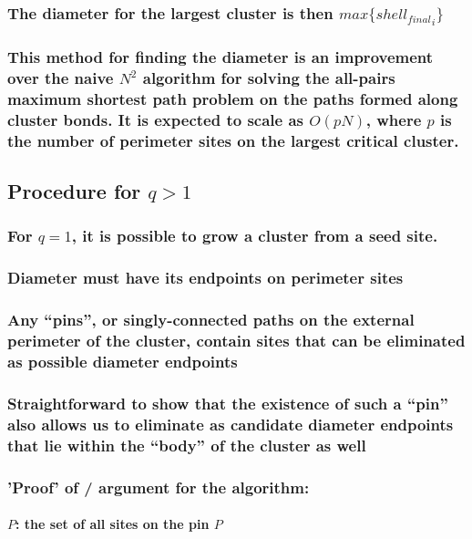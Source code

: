 \documentclass[pre,preprint]{revtex4-1}
\begin{document}
\subsubsection{The diameter for the largest cluster is then $max\{{shell_{final}}_i\}$}
\label{sec-2.3.7}
\subsubsection{This method for finding the diameter is an improvement over the naive $N^2$ algorithm for solving the all-pairs maximum shortest path problem on the paths formed along cluster bonds. It is expected to scale as $O(pN)$, where $p$ is the number of perimeter sites on the largest critical cluster.}
\label{sec-2.3.8}
\subsection{Procedure for $q>1$}
\label{sec-2.4}
\subsubsection{For $q=1$, it is possible to grow a cluster from a seed site.}
\label{sec-2.4.1}
\subsubsection{Diameter must have its endpoints on perimeter sites}
\label{sec-2.4.2}
\subsubsection{Any ``pins'', or singly-connected paths on the external perimeter of the cluster, contain sites that can be eliminated as possible diameter endpoints}
\label{sec-2.4.3}
\subsubsection{Straightforward to show that the existence of such a ``pin'' also allows us to eliminate as candidate diameter endpoints that lie within the ``body'' of the cluster as well}
\label{sec-2.4.4}
\subsubsection{'Proof' of / argument for the algorithm:}
\label{sec-2.4.5}
\paragraph{$P$: the set of all sites on the pin $P$}
\label{sec-2.4.5.1}
\end{document}
